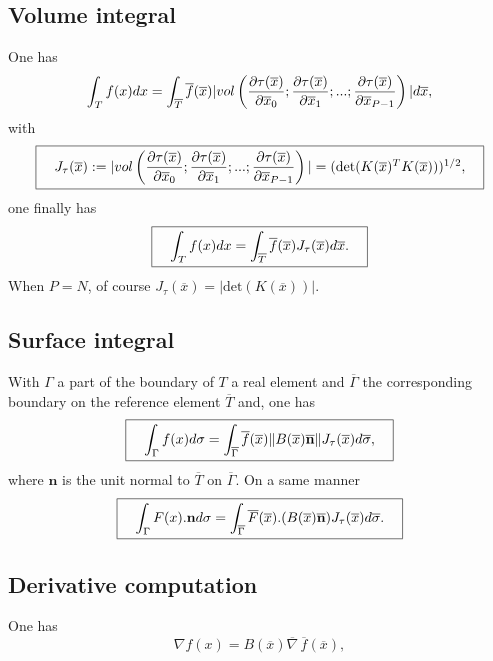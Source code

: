 \documentclass[11pt,a4paper]{article}
\begin{document}
\subsection{Volume integral}
One has
$$ \int_T f(x) dx = \int_{\overline{T}} \overline{f}(\overline{x}) |vol\left({\displaystyle \frac{\displaystyle \partial \tau(\overline{x})}{\displaystyle \partial \overline{x}_0}} ;{\displaystyle \frac{\displaystyle \partial \tau(\overline{x})}{\displaystyle \partial \overline{x}_1}}; ...; {\displaystyle \frac{\displaystyle \partial \tau(\overline{x})}{\displaystyle \partial \overline{x}_{P-1} }}\right)| d\overline{x}, $$
with
$$ \fbox{$\hspace{1em} J_{\tau}(\overline{x}) := |vol\left({\displaystyle \frac{\displaystyle \partial \tau(\overline{x})}{\displaystyle \partial \overline{x}_0}} ;{\displaystyle \frac{\displaystyle \partial \tau(\overline{x})}{\displaystyle \partial \overline{x}_1}}; ...; {\displaystyle \frac{\displaystyle \partial \tau(\overline{x})}{\displaystyle \partial \overline{x}_{P-1} }}\right)| = (\mbox{det}(K(\overline{x})^T K(\overline{x})))^{1/2},\hspace{1em}$} $$
one finally has
$$ \fbox{$\hspace{1em} \displaystyle \int_T f(x) dx = \int_{\overline{T}} \overline{f}(\overline{x})  J_{\tau}(\overline{x})d\overline{x}.\hspace{1em}$} $$
When $P = N$, of course $J_{\tau}(\overline{x}) = |\mbox{det}(K(\overline{x}))|$.

\subsection{Surface integral}
With $\Gamma$ a part of the boundary of $T$ a real element and $\overline{\Gamma}$ the corresponding boundary on the reference element $\overline{T}$ and, one has
$$ \fbox{$\hspace{1em} \displaystyle \int_{\Gamma} f(x) d\sigma = \int_{\overline{\Gamma}} \overline{f}(\overline{x}) \|B(\overline{x})\overline{\mathbf n}\| J_{\tau}(\overline{x}) d\overline{\sigma},\hspace{1em}$} $$
where ${\mathbf n}$ is the unit normal to $\overline{T}$ on $\overline{\Gamma}$. On a same manner
$$ \fbox{$\hspace{1em} \displaystyle \int_{\Gamma} F(x).{\mathbf n} d\sigma = \int_{\overline{\Gamma}} \overline{F}(\overline{x}).(B(\overline{x})\overline{\mathbf n}) J_{\tau}(\overline{x}) d\overline{\sigma}.\hspace{1em}$} $$

\subsection{Derivative computation}
One has
$$ \nabla f(x) = B(\overline{x}) \overline{\nabla}\,\overline{f}(\overline{x}), $$
\end{document}

